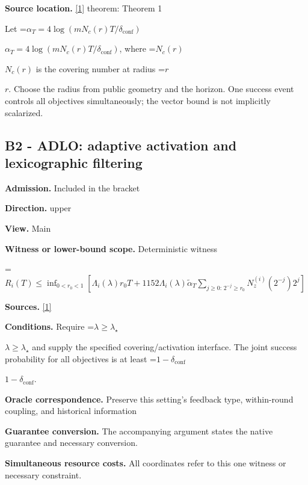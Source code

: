\documentclass[10pt,a4paper]{article}
\newcommand{\AtlasMath}[1]{\par\begingroup\centering\setbox0=\hbox{$\displaystyle #1$}\ifdim\wd0>1.4\linewidth\typeout{ATLAS WIDE FORMULA: \the\wd0}\fi\ifdim\wd0>\linewidth\resizebox{\linewidth}{!}{\box0}\else\box0\fi\par\endgroup}
\newcommand{\AtlasInlineMath}[1]{\begingroup\setbox0=\hbox{$#1$}\ifdim\wd0>.4\linewidth\endgroup\AtlasMath{#1}\else\endgroup$#1$\fi}
\begin{document}
\textbf{Source location.} \href{https://jmlr.org/papers/volume26/24-1047/24-1047.pdf}{[1]} theorem: Theorem 1



Let \AtlasInlineMath{\alpha_T=4\log(mN_c(r)T/\delta_{\mathrm{conf}})}, where \AtlasInlineMath{N_c(r)} is the covering number at radius \AtlasInlineMath{r}. Choose the radius from public geometry and the horizon. One success event controls all objectives simultaneously; the vector bound is not implicitly scalarized.



\subsection{B2 - ADLO: adaptive activation and lexicographic filtering}


\textbf{Admission.} Included in the bracket



\textbf{Direction.} upper



\textbf{View.} Main



\textbf{Witness or lower-bound scope.} Deterministic witness



\AtlasMath{R_i(T)\le\inf_{0<r_0<1}\!\left[\Lambda_i(\lambda)r_0T+1152\Lambda_i(\lambda)\widetilde\alpha_T\sum_{j\ge0:\,2^{-j}\ge r_0}N_z^{(i)}(2^{-j})2^j\right]}


\textbf{Sources.} \href{https://jmlr.org/papers/volume26/24-1047/24-1047.pdf}{[1]}



\textbf{Conditions.} Require \AtlasInlineMath{\lambda\ge\lambda_\star} and supply the specified covering/activation interface. The joint success probability for all objectives is at least \AtlasInlineMath{1-\delta_{\mathrm{conf}}}.



\textbf{Oracle correspondence.} Preserve this setting's feedback type, within-round coupling, and historical information



\textbf{Guarantee conversion.} The accompanying argument states the native guarantee and necessary conversion.



\textbf{Simultaneous resource costs.} All coordinates refer to this one witness or necessary constraint.
\end{document}
